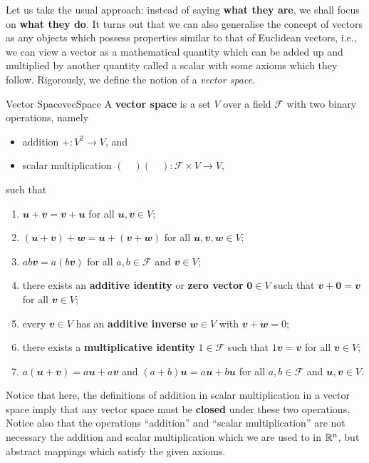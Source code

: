 \documentclass[math, code]{amznotes}
\theoremstyle{remark}
\newcommand{\zero}{\mathbf{0}}
\begin{document}
Let us take the usual approach: instead of saying \textbf{what they are}, we shall focus on \textbf{what they do}. It turns out that we can also generalise the concept of vectors as any objects which possess properties similar to that of Euclidean vectors, i.e., we can view a vector as a mathematical quantity which can be added up and multiplied by another quantity called a scalar with some axioms which they follow. Rigorously, we define the notion of a \textit{vector space}.
\begin{dfnbox}{Vector Space}{vecSpace}
    A {\color{red} \textbf{vector space}} is a set $V$ over a field $\mathcal{F}$ with two binary operations, namely 
    \begin{itemize}
        \item addition $+ \colon V^2 \to V$, and
        \item scalar multiplication $(\quad)(\quad) \colon \mathcal{F} \times V \to V$,
    \end{itemize}
    such that
    \begin{enumerate}
        \item $\mathbfit{u + v = v + u}$ for all $\mathbfit{u}, \mathbfit{v} \in V$;
        \item $\mathbfit{(u + v) + w = u + (v + w)}$ for all $\mathbfit{u, v, w} \in V$;
        \item $ab\mathbfit{v} = a(b\mathbfit{v})$ for all $a, b \in \mathcal{F}$ and $\mathbfit{v} \in V$;
        \item there exists an {\color{red} \textbf{additive identity}} or {\color{red} \textbf{zero vector}} $\zero \in V$ such that $\mathbfit{v} + \zero = \mathbfit{v}$ for all $\mathbfit{v} \in V$;
        \item every $\mathbfit{v} \in V$ has an {\color{red} \textbf{additive inverse}} $\mathbfit{w} \in V$ with $\mathbfit{v + w} = 0$;
        \item there exists a {\color{red} \textbf{multiplicative identity}} $1 \in \mathcal{F}$ such that $1\mathbfit{v} = \mathbfit{v}$ for all $\mathbfit{v} \in V$;
        \item $a\mathbfit{(u + v)} = a\mathbfit{u} + a\mathbfit{v}$ and $(a + b)\mathbfit{u} = a\mathbfit{u} + b\mathbfit{u}$ for all $a, b \in \mathcal{F}$ and $\mathbfit{u, v} \in V$.
    \end{enumerate}
\end{dfnbox}
Notice that here, the definitions of addition in scalar multiplication in a vector space imply that any vector space must be \textbf{closed} under these two operations. Notice also that the operations ``addition'' and ``scalar multiplication'' are not necessary the addition and scalar multiplication which we are used to in $\mathbb{R}^n$, but abstract mappings which satisfy the given axioms.
\end{document}
